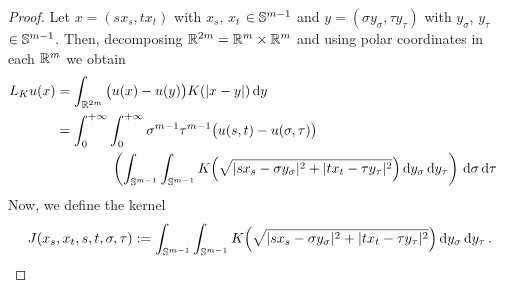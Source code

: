 \begin{proof}
%
%	
Let $x = (s x_s, t x_t)$ with $x_s$, $x_t$ $\in \mathbb{S}^{m-1}$ and $y = (\sigma y_\sigma, \tau
y_\tau)$ with $y_\sigma$, $y_\tau$ $\in \mathbb{S}^{m-1}$. Then, decomposing $\mathbb{R}^{2m} = \mathbb{R}^m \times \mathbb{R}^m$
and using polar coordinates in each $\mathbb{R}^m$ we obtain
\begin{align*}
L_Ku(x) &= \int_{\mathbb{R}^{2m}} \big( u(x) - u(y)\big) K( |x-y|) \,\mathrm{d} y &\\
&= \int_0^{+\infty}  \int_0^{+\infty} \sigma^{m-1} \tau^{m-1} \big(u(s,t) - u(\sigma, \tau)\big)  \\
&\quad \quad \quad \quad  \left ( {\int_{\mathbb{S}^{m-1}}  \int_{\mathbb{S}^{m-1}} K \Big( \sqrt{|sx_s - \sigma y_\sigma|^2 + |t x_t - \tau y_\tau|^2 } \Big) \,\mathrm{d} y_\sigma \,\mathrm{d} y_\tau }\right ) \,\mathrm{d} \sigma \,\mathrm{d} \tau
\end{align*}
Now, we define the kernel
\begin{equation}
\label{Eq:KernelSTVariablesProof1}
J(x_s, x_t, s,t,\sigma, \tau) := \int_{\mathbb{S}^{m-1}}  \int_{\mathbb{S}^{m-1}} K \Big( \sqrt{|sx_s - \sigma y_\sigma|^2 + |t x_t - \tau y_\tau|^2 }\Big ) \,\mathrm{d} y_\sigma \,\mathrm{d} y_\tau \,.
\end{equation}


\end{proof}
